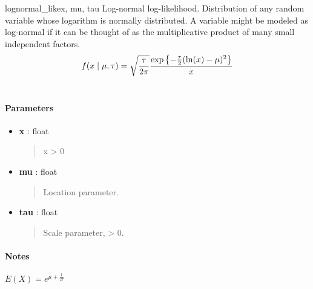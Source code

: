 \hypertarget{pymc.distributions.lognormal_like}{}\begin{funcdesc}{lognormal\_like}{x, mu, tau}
Log-normal log-likelihood. Distribution of any random variable whose
logarithm is normally distributed. A variable might be modeled as
log-normal if it can be thought of as the multiplicative product of many
small independent factors.
\begin{gather}
\begin{split}f(x \mid \mu, \tau) = \sqrt{\frac{\tau}{2\pi}}\frac{
\exp\left\{ -\frac{\tau}{2} (\ln(x)-\mu)^2 \right\}}{x}\end{split}\notag\\\begin{split}\end{split}\notag
\end{gather}\paragraph{Parameters}\begin{itemize}

\item[] \textbf{x} : float
\begin{quote}

x \textgreater{} 0
\end{quote}

\item[] \textbf{mu} : float
\begin{quote}

Location parameter.
\end{quote}

\item[] \textbf{tau} : float
\begin{quote}

Scale parameter, \textgreater{} 0.
\end{quote}
\end{itemize}
\paragraph{Notes}

$E(X)=e^{\mu+\frac{1}{2\tau}}$
\end{funcdesc}


